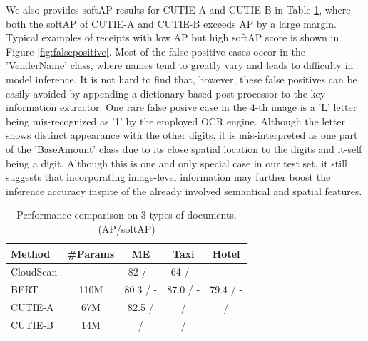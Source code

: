\documentclass[10pt,twocolumn,letterpaper]{article}
\begin{document}
We also provides softAP results for CUTIE-A and CUTIE-B in Table \ref{tab:comparison}, where both the softAP of CUTIE-A and CUTIE-B exceeds AP by a large margin. Typical examples of receipts with low AP but high softAP score is shown in Figure \ref{fig:falsepositive}. Most of the false positive cases occor in the 'VenderName' class, where names tend to greatly vary and leads to difficulty in model inference. It is not hard to find that, however, these false positives can be easily avoided by appending a dictionary based post processor to the key information extractor. One rare false posive case in the $4$-th image is a 'L' letter being mis-recognized as '1' by the employed OCR engine. Although the letter shows distinct appearance with the other digits, it is mis-interpreted as one part of the 'BaseAmount' class due to its close spatial location to the digits and it-self being a digit. Although this is one and only special case in our test set, it still suggests that incorporating image-level information may further boost the inference accuracy inspite of the already involved semantical and spatial features.
\begin{table}
	\caption{Performance comparison on 3 types of documents. (AP/softAP)}
\begin{center}
\begin{tabular}{l | c | c | c | c}
	Method & \#Params & ME & Taxi & Hotel \\
	\hline
	CloudScan & - & 82 / - & 64 / - & \\
	BERT & 110M & 80.3 / - & 87.0 / - & 79.4 / - \\
	CUTIE-A & 67M & 82.5 / & / & / \\
	CUTIE-B & 14M & / & / \\
\end{tabular}
\end{center}
	\label{tab:comparison}
\end{table}
\end{document}
